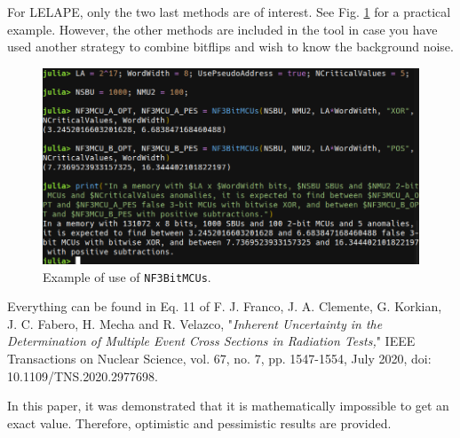 \begin{itemize}
	For LELAPE, only the two last methods are of interest. See Fig. \ref{fig:Example_NF3BitMCUs} for a practical example. However, the other methods are included in the tool in case you have used another strategy to combine bitflips and wish to know the background noise.
	
	\begin{figure}[h!]
		\centering
		\includegraphics[width=0.75\columnwidth]{fig/functions/NF3BitMCUs.png}
		\caption{Example of use of \texttt{NF3BitMCUs}.}
		\label{fig:Example_NF3BitMCUs}
	\end{figure}	
	
	
	Everything can be found in Eq. 11 of F. J. Franco, J. A. Clemente, G. Korkian, 
	J. C. Fabero, H. Mecha and R. Velazco, "\textit{Inherent Uncertainty in the Determination of Multiple 
		Event Cross Sections in Radiation Tests,}" IEEE Transactions on Nuclear Science, vol. 67, no. 7, 
	pp. 1547-1554, July 2020, doi: 10.1109/TNS.2020.2977698.
	
	In this paper, it was demonstrated that it is mathematically impossible to get an exact value. Therefore,  optimistic and pessimistic results are provided.
\end{itemize}